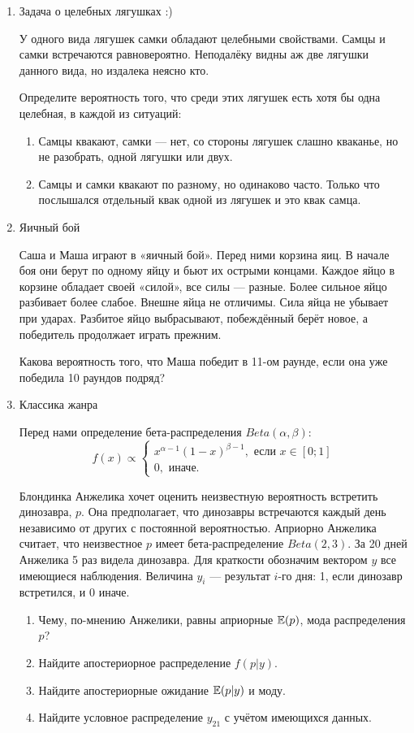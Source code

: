 \documentclass[12pt, a4paper]{article}\usepackage[]{graphicx}\usepackage[]{color}
\begin{document}
\begin{enumerate}

\item Задача о целебных лягушках :)

У одного вида лягушек самки обладают целебными свойствами. Самцы и самки встречаются равновероятно. Неподалёку видны аж две лягушки данного вида, но издалека неясно кто.

Определите вероятность того, что среди этих лягушек есть хотя бы одна целебная, в каждой из ситуаций:
\begin{enumerate}
  \item Самцы квакают, самки — нет, со стороны лягушек слашно кваканье, но не разобрать, одной лягушки или двух.
  \item Самцы и самки квакают по разному, но одинаково часто. Только что послышался отдельный квак одной из лягушек и это квак самца.
\end{enumerate}

\item Яичный бой

Саша и Маша играют в «яичный бой». Перед ними корзина яиц. В начале боя они берут по одному яйцу и бьют их острыми концами. Каждое яйцо в корзине обладает своей «силой», все силы — разные. Более сильное яйцо разбивает более слабое. Внешне яйца не отличимы. Сила яйца не убывает при ударах. Разбитое яйцо выбрасывают, побеждённый берёт новое, а победитель продолжает играть прежним.

Какова вероятность того, что Маша победит в 11-ом раунде, если она уже победила 10 раундов подряд?

\item Классика жанра

Перед нами определение бета-распределения $Beta(\alpha, \beta)$:
\[
f(x) \propto \begin{cases}
x^{\alpha-1}(1-x)^{\beta-1}, \text{ если } x\in[0;1] \\
0, \text{ иначе.}
\end{cases}
\]

Блондинка Анжелика хочет оценить неизвестную вероятность встретить динозавра, $p$. Она предполагает, что динозавры встречаются каждый день независимо от других с постоянной вероятностью. Априорно Анжелика считает, что неизвестное $p$ имеет бета-распределение $Beta(2, 3)$. За 20 дней Анжелика 5 раз видела динозавра. Для краткости обозначим вектором $y$ все имеющиеся наблюдения. Величина $y_i$ — результат $i$-го дня: 1, если динозавр встретился, и 0 иначе.
\begin{enumerate}
\item Чему, по-мнению Анжелики, равны априорные $\mathbb{E}(p)$, мода распределения $p$?
\item Найдите апостериорное распределение $f(p|y)$.
\item Найдите апостериорные ожидание $\mathbb{E}(p|y)$ и моду.
\item Найдите условное распределение $y_{21}$ с учётом имеющихся данных.
\end{enumerate}


\end{enumerate}
\end{document}
